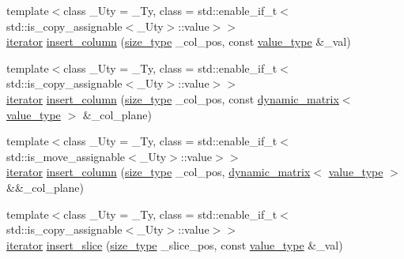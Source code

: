 \begin{DoxyCompactItemize}
\item 
{\footnotesize template$<$class \+\_\+\+Uty  = \+\_\+\+Ty, class  = std\+::enable\+\_\+if\+\_\+t$<$std\+::is\+\_\+copy\+\_\+assignable$<$\+\_\+\+Uty$>$\+::value$>$$>$ }\\\hyperlink{classcrsc_1_1dynamic__r3__tensor_a8da8f1c3ec1cde63d7693e41c9e7f496}{iterator} \hyperlink{classcrsc_1_1dynamic__r3__tensor_a6b7321aa88571d138440ecbcc4c7509b}{insert\+\_\+column} (\hyperlink{classcrsc_1_1dynamic__r3__tensor_a00e5f1f46f16d0c0ac1cffa6bd0fe862}{size\+\_\+type} \+\_\+col\+\_\+pos, const \hyperlink{classcrsc_1_1dynamic__r3__tensor_ad7fb44388c819fb7947771da18bb625b}{value\+\_\+type} \&\+\_\+val)
\item 
{\footnotesize template$<$class \+\_\+\+Uty  = \+\_\+\+Ty, class  = std\+::enable\+\_\+if\+\_\+t$<$std\+::is\+\_\+copy\+\_\+assignable$<$\+\_\+\+Uty$>$\+::value$>$$>$ }\\\hyperlink{classcrsc_1_1dynamic__r3__tensor_a8da8f1c3ec1cde63d7693e41c9e7f496}{iterator} \hyperlink{classcrsc_1_1dynamic__r3__tensor_ac1e8cf1859f33d037a77380dec077e01}{insert\+\_\+column} (\hyperlink{classcrsc_1_1dynamic__r3__tensor_a00e5f1f46f16d0c0ac1cffa6bd0fe862}{size\+\_\+type} \+\_\+col\+\_\+pos, const \hyperlink{classcrsc_1_1dynamic__matrix}{dynamic\+\_\+matrix}$<$ \hyperlink{classcrsc_1_1dynamic__r3__tensor_ad7fb44388c819fb7947771da18bb625b}{value\+\_\+type} $>$ \&\+\_\+col\+\_\+plane)
\item 
{\footnotesize template$<$class \+\_\+\+Uty  = \+\_\+\+Ty, class  = std\+::enable\+\_\+if\+\_\+t$<$std\+::is\+\_\+move\+\_\+assignable$<$\+\_\+\+Uty$>$\+::value$>$$>$ }\\\hyperlink{classcrsc_1_1dynamic__r3__tensor_a8da8f1c3ec1cde63d7693e41c9e7f496}{iterator} \hyperlink{classcrsc_1_1dynamic__r3__tensor_a3598ebdecc699d3fb60fc0705b8e339e}{insert\+\_\+column} (\hyperlink{classcrsc_1_1dynamic__r3__tensor_a00e5f1f46f16d0c0ac1cffa6bd0fe862}{size\+\_\+type} \+\_\+col\+\_\+pos, \hyperlink{classcrsc_1_1dynamic__matrix}{dynamic\+\_\+matrix}$<$ \hyperlink{classcrsc_1_1dynamic__r3__tensor_ad7fb44388c819fb7947771da18bb625b}{value\+\_\+type} $>$ \&\&\+\_\+col\+\_\+plane)
\item 
{\footnotesize template$<$class \+\_\+\+Uty  = \+\_\+\+Ty, class  = std\+::enable\+\_\+if\+\_\+t$<$std\+::is\+\_\+copy\+\_\+assignable$<$\+\_\+\+Uty$>$\+::value$>$$>$ }\\\hyperlink{classcrsc_1_1dynamic__r3__tensor_a8da8f1c3ec1cde63d7693e41c9e7f496}{iterator} \hyperlink{classcrsc_1_1dynamic__r3__tensor_ac3b11c8734e4a9d37d2d743d260f5ee1}{insert\+\_\+slice} (\hyperlink{classcrsc_1_1dynamic__r3__tensor_a00e5f1f46f16d0c0ac1cffa6bd0fe862}{size\+\_\+type} \+\_\+slice\+\_\+pos, const \hyperlink{classcrsc_1_1dynamic__r3__tensor_ad7fb44388c819fb7947771da18bb625b}{value\+\_\+type} \&\+\_\+val)

\end{DoxyCompactItemize}
